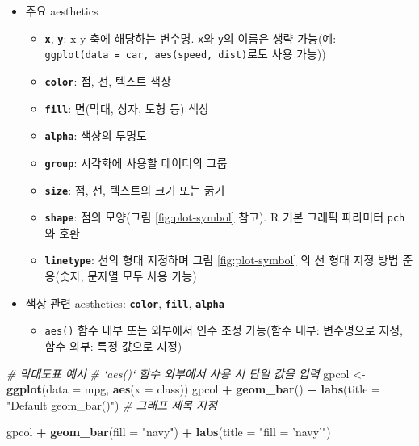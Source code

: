 \documentclass[
  11pt,
]{krantz}
\newenvironment{Shaded}{\begin{snugshade}}{\end{snugshade}}
\newcommand{\CommentTok}[1]{\textcolor[rgb]{0.37,0.37,0.37}{\textit{#1}}}
\newcommand{\DataTypeTok}[1]{\textcolor[rgb]{0.27,0.27,0.27}{#1}}
\newcommand{\KeywordTok}[1]{\textcolor[rgb]{0.27,0.27,0.27}{\textbf{#1}}}
\newcommand{\NormalTok}[1]{#1}
\newcommand{\OperatorTok}[1]{\textcolor[rgb]{0.43,0.43,0.43}{\textbf{#1}}}
\newcommand{\StringTok}[1]{\textcolor[rgb]{0.5,0.5,0.5}{#1}}
\providecommand{\tightlist}{%
  \setlength{\itemsep}{0pt}\setlength{\parskip}{0pt}}
\begin{document}
\begin{itemize}
\tightlist
\item
  주요 aesthetics

  \begin{itemize}
  \tightlist
  \item
    \textbf{\texttt{x}}, \textbf{\texttt{y}}: x-y 축에 해당하는 변수명. \texttt{x}와 \texttt{y}의 이름은 생략 가능(예: \texttt{ggplot(data\ =\ car,\ aes(speed,\ dist)}로도 사용 가능))
  \item
    \textbf{\texttt{color}}: 점, 선, 텍스트 색상
  \item
    \textbf{\texttt{fill}}: 면(막대, 상자, 도형 등) 색상
  \item
    \textbf{\texttt{alpha}}: 색상의 투명도
  \item
    \textbf{\texttt{group}}: 시각화에 사용할 데이터의 그룹
  \item
    \textbf{\texttt{size}}: 점, 선, 텍스트의 크기 또는 굵기
  \item
    \textbf{\texttt{shape}}: 점의 모양(그림 \ref{fig:plot-symbol} 참고). R 기본 그래픽 파라미터 \texttt{pch}와 호환
  \item
    \textbf{\texttt{linetype}}: 선의 형태 지정하며 그림 \ref{fig:plot-symbol} 의 선 형태 지정 방법 준용(숫자, 문자열 모두 사용 가능)
  \end{itemize}
\item
  색상 관련 aesthetics: \textbf{\texttt{color}}, \textbf{\texttt{fill}}, \textbf{\texttt{alpha}}

  \begin{itemize}
  \tightlist
  \item
    \texttt{aes()} 함수 내부 또는 외부에서 인수 조정 가능(함수 내부: 변수명으로 지정, 함수 외부: 특정 값으로 지정)
  \end{itemize}
\end{itemize}

\footnotesize

\begin{Shaded}
\begin{Highlighting}[]
\CommentTok{# 막대도표 예시}
\CommentTok{# `aes()` 함수 외부에서 사용 시 단일 값을 입력}
\NormalTok{gpcol <-}\StringTok{ }\KeywordTok{ggplot}\NormalTok{(}\DataTypeTok{data =}\NormalTok{ mpg, }\KeywordTok{aes}\NormalTok{(}\DataTypeTok{x =}\NormalTok{ class))}
\NormalTok{gpcol }\OperatorTok{+}\StringTok{ }\KeywordTok{geom_bar}\NormalTok{() }\OperatorTok{+}\StringTok{ }
\StringTok{  }\KeywordTok{labs}\NormalTok{(}\DataTypeTok{title =} \StringTok{"Default geom_bar()"}\NormalTok{) }\CommentTok{# 그래프 제목 지정}

\NormalTok{gpcol }\OperatorTok{+}\StringTok{ }\KeywordTok{geom_bar}\NormalTok{(}\DataTypeTok{fill =} \StringTok{"navy"}\NormalTok{) }\OperatorTok{+}\StringTok{ }
\StringTok{  }\KeywordTok{labs}\NormalTok{(}\DataTypeTok{title =} \StringTok{"fill = 'navy'"}\NormalTok{)}
\end{Highlighting}
\end{Shaded}
\end{document}

